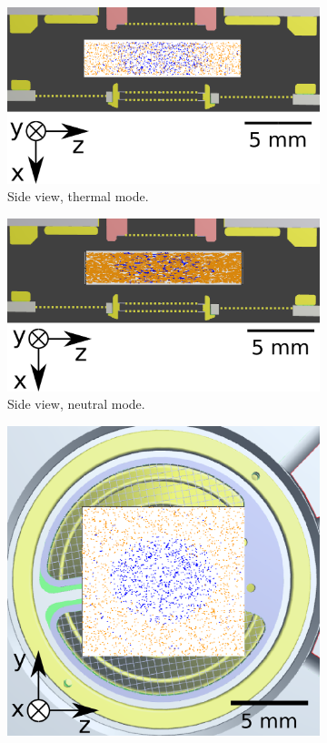 	\begin{figure}[h] %
		\begin{subfigure}[t]{.5\textwidth}
			\centering
			\includegraphics[width=.8\textwidth]{Experiments/PFMEntrance_Side_thSim.png}
			\caption{Side view, thermal mode.}
		\end{subfigure}
		\begin{subfigure}[t]{.5\textwidth}
			\centering
			\includegraphics[width=.8\textwidth]{Experiments/PFMEntrance_Side_nSim.png}
			\caption{Side view, neutral mode.}
		\end{subfigure}
		\begin{subfigure}[b]{.5\textwidth}
			\centering
			\includegraphics[width=.8\textwidth]{Experiments/PFMEntrance_Top_thSim.png}

\end{subfigure}
\end{figure}
